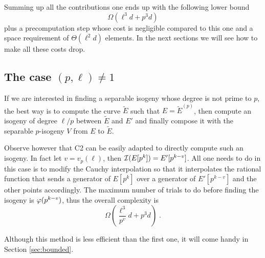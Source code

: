 Summing up all the contributions one ends up with the following lower
bound
\begin{equation}
  \label{eq:C2:complexity}
  \Omega(\ell^3d + p^3d)
\end{equation}
plus a precomputation step whose cost is negligible compared to this
one and a space requirement of $\Theta(\ell^2d)$ elements. In the next
sections we will see how to make all these costs drop.


\subsection{The case $(p,\ell)\ne1$}
\label{sec:C2:non-prime}
If we are interested in finding a separable isogeny whose degree is
not prime to $p$, the best way is to compute the curve $\widetilde{E}$
such that $E = \widetilde{E}^{(p)}$, then compute an isogeny of degree
$\ell/p$ between $\widetilde{E}$ and $E'$ and finally compose it with
the separable $p$-isogeny $V$ from $E$ to $\widetilde{E}$.

Observe however that C2 can be easily adapted to directly compute such
an isogeny. In fact let $v=v_p(\ell)$, then $\mathcal{I}(E[p^k]) =
E'[p^{k-v}]$. All one needs to do in this case is to modify the Cauchy
interpolation so that it interpolates the rational function that sends
a generator of $E[p^k]$ over a generator of $E'[p^{k-v}]$ and the
other points accordingly. The maximum number of trials to do before
finding the isogeny is $\varphi(p^{k-v})$, thus the overall complexity
is
\begin{equation}
  \label{eq:C2:complexity-non-prime}
  \Omega\left(\frac{\ell^3}{p^v}d + p^3d\right)
  \;\text{.}
\end{equation}

Although this method is less efficient than the first one, it will
come handy in Section \ref{sec:bounded}.



%
